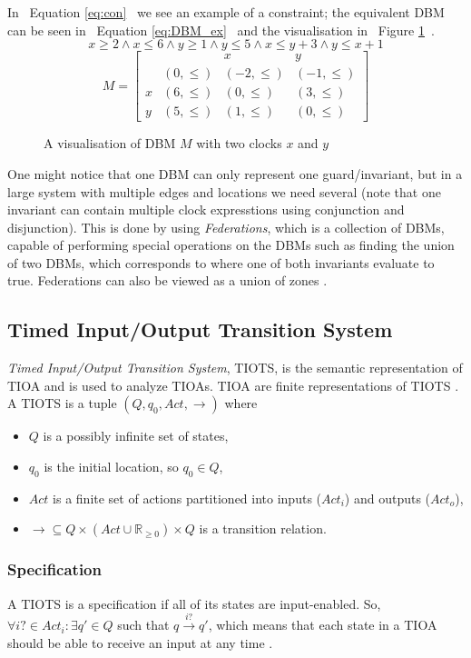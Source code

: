 In ~Equation \ref{eq:con}~ we see an example of a constraint; the equivalent DBM can be seen in ~Equation \ref{eq:DBM_ex}~ and the visualisation in ~Figure \ref{fig:DBM_ex}~.
\begin{equation}\label{eq:con}
    x \geq 2 \wedge x \leq 6 \wedge y \geq 1 \wedge y \leq 5 \wedge x \leq y + 3 \wedge y \leq x + 1
\end{equation}
\begin{equation}\label{eq:DBM_ex}
    M = 
    \begin{bmatrix}
                 &&    x    &    y\\
          & (0, \leq) & (-2, \leq) & (-1, \leq)\\
        x & (6, \leq) & (0, \leq) & (3, \leq)\\
        y & (5, \leq) & (1, \leq) & (0, \leq) 
    \end{bmatrix}
\end{equation}

\begin{figure}[H]
    \centering
    \caption{A visualisation of DBM $M$ with two clocks $x$ and $y$}
    \label{fig:DBM_ex}
\end{figure}

One might notice that one DBM can only represent one guard/invariant, but in a large system with multiple edges and locations we need several (note that one invariant can contain multiple clock expresstions using conjunction and disjunction). This is done by using \emph{Federations}, which is a collection of DBMs, capable of performing special operations on the DBMs such as finding the union of two DBMs, which corresponds to where one of both invariants evaluate to true. Federations can also be viewed as a union of zones \cite{ecdartheory, Rokicki_DBM}.

\subsection{Timed Input/Output Transition System}\label{sec:TIOTS}

\emph{Timed Input/Output Transition System}, TIOTS, is the semantic representation of TIOA and is used to analyze TIOAs. TIOA are finite representations of TIOTS \cite{ecdartheory}. A TIOTS is a tuple \cite{ecdartheory}  $(Q, q_{0}, Act, \rightarrow)$ where

\begin{itemize}
    \item $Q$ is a possibly infinite set of states,
    \item $q_{0}$ is the initial location, so $q_{0} \in Q$,
    \item $Act$ is a finite set of actions partitioned into inputs ($Act_{i}$) and outputs ($Act_{o}$),
    \item $\rightarrow \subseteq Q \times (Act \cup \mathbb{R}_{\geq 0}) \times Q$ is a transition relation.
\end{itemize}

\subsubsection{Specification}
A TIOTS is a specification if all of its states are input-enabled. So, $\forall i? \in Act_i : \exists q' \in Q$ such that $q \xrightarrow{i?} q'$, which means that each state in a TIOA should be able to receive an input at any time \cite{ecdartheory}.